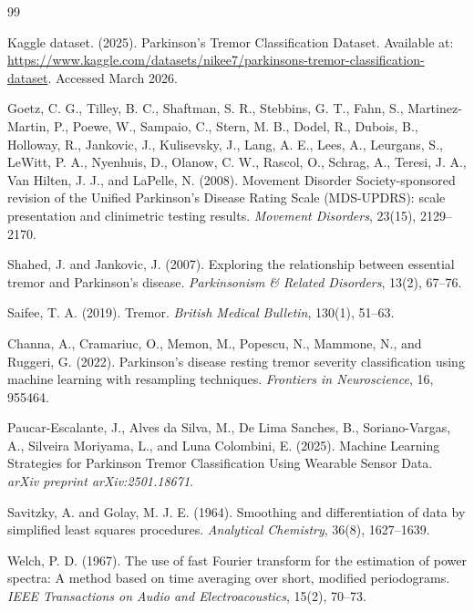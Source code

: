 \documentclass[10pt,twocolumn]{article}
\begin{document}
\begin{thebibliography}{99}

Kaggle dataset. (2025).
Parkinson's Tremor Classification Dataset.
Available at: \url{https://www.kaggle.com/datasets/nikee7/parkinsons-tremor-classification-dataset}.
Accessed March 2026.

Goetz, C. G., Tilley, B. C., Shaftman, S. R., Stebbins, G. T., Fahn, S., Martinez-Martin, P., Poewe, W., Sampaio, C., Stern, M. B., Dodel, R., Dubois, B., Holloway, R., Jankovic, J., Kulisevsky, J., Lang, A. E., Lees, A., Leurgans, S., LeWitt, P. A., Nyenhuis, D., Olanow, C. W., Rascol, O., Schrag, A., Teresi, J. A., Van Hilten, J. J., and LaPelle, N. (2008).
Movement Disorder Society-sponsored revision of the Unified Parkinson's Disease Rating Scale (MDS-UPDRS): scale presentation and clinimetric testing results.
\textit{Movement Disorders}, 23(15), 2129--2170.

Shahed, J. and Jankovic, J. (2007).
Exploring the relationship between essential tremor and Parkinson's disease.
\textit{Parkinsonism \& Related Disorders}, 13(2), 67--76.

Saifee, T. A. (2019).
Tremor.
\textit{British Medical Bulletin}, 130(1), 51--63.

Channa, A., Cramariuc, O., Memon, M., Popescu, N., Mammone, N., and Ruggeri, G. (2022).
Parkinson's disease resting tremor severity classification using machine learning with resampling techniques.
\textit{Frontiers in Neuroscience}, 16, 955464.

Paucar-Escalante, J., Alves da Silva, M., De Lima Sanches, B., Soriano-Vargas, A., Silveira Moriyama, L., and Luna Colombini, E. (2025).
Machine Learning Strategies for Parkinson Tremor Classification Using Wearable Sensor Data.
\textit{arXiv preprint arXiv:2501.18671}.

Savitzky, A. and Golay, M. J. E. (1964).
Smoothing and differentiation of data by simplified least squares procedures.
\textit{Analytical Chemistry}, 36(8), 1627--1639.

Welch, P. D. (1967).
The use of fast Fourier transform for the estimation of power spectra: A method based on time averaging over short, modified periodograms.
\textit{IEEE Transactions on Audio and Electroacoustics}, 15(2), 70--73.


\end{thebibliography}
\end{document}
